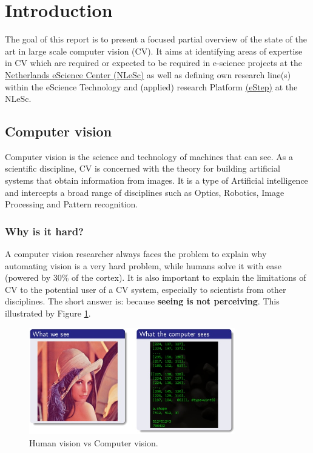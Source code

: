 \section{Introduction}
\label{sec:intro}
  
The goal of this report is to present a focused partial overview of the state of the art in large scale computer vision (CV).  It aims at identifying areas of expertise in CV which are required or expected to be required in e-science projects at the \href{https://www.esciencecenter.nl/}{Netherlands eScience Center (NLeSc)} as well as defining own research line(s) within the eScience Technology and (applied) research Platform \href{https://www.esciencecenter.nl/site/project/estep}{(eStep)} at the NLeSc.

\subsection{Computer vision}

Computer vision is the science and technology of machines that can see. As a scientific discipline, CV is concerned with the theory for building artificial systems that obtain information from images. It is a type of Artificial intelligence and intercepts a broad range of disciplines such as Optics, Robotics, Image Processing and Pattern recognition. 

\subsubsection{Why is it hard?}
A computer vision researcher always faces the problem to explain why automating vision is a very hard problem, while humans solve it with ease (powered by $30\%$ of the cortex). It is also important to explain the limitations of CV to the potential user of a CV system, especially to scientists from other disciplines. The short answer is: because {\bf seeing is not perceiving}. This illustrated by Figure \ref{fig:CV}.
\begin{figure}[H]
\begin{center}
\includegraphics[width=0.8\textwidth]{fig/ManVsPC}
\end{center}
\caption{Human vision vs Computer vision.}
\label{fig:CV}
\end{figure}

